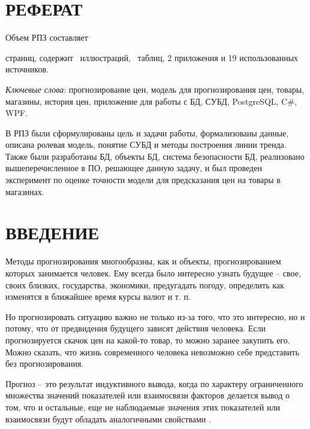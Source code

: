 \documentclass[a4paper]{bmstu}
\begin{document}

\setcounter{page}{3}

\chapter*{РЕФЕРАТ}

Объем РПЗ составляет \begin{NoHyper}\pageref{LastPage}\end{NoHyper} страниц, содержит \totfig~иллюстраций, \tottab~таблиц, 2 приложения и 19 использованных источников.

\textit{Ключевые слова}: прогнозирование цен, модель для прогнозирования цен, товары, магазины, история цен, приложение для работы с БД, СУБД, PostgreSQL, C\#, WPF.

В РПЗ были сформулированы цель и задачи работы, формализованы данные, описана ролевая модель, понятие СУБД и методы построения линии тренда. Также были разработаны БД, объекты БД, система безопасности БД, реализовано вышеперечисленное в ПО, решающее данную задачу, и был проведен эксперимент по оценке точности модели для предсказания цен на товары в магазинах.

\maketableofcontents

\chapter*{ВВЕДЕНИЕ}

Методы прогнозирования многообразны, как и объекты, прогнозированием которых занимается человек. Ему всегда было интересно узнать будущее -- свое, своих близких, государства, экономики, предугадать погоду, определить как изменятся в ближайшее время курсы валют и т. п.

Но прогнозировать ситуацию важно не только из-за того, что это интересно, но и потому, что от предвидения будущего зависят действия человека. Если прогнозируется скачок цен на какой-то товар, то можно заранее закупить его. Можно сказать, что жизнь современного человека невозможно себе представить без прогнозирования.

Прогноз -- это результат индуктивного вывода, когда по характеру ограниченного множества значений показателей или взаимосвязи факторов делается вывод о том, что и остальные, еще не наблюдаемые значения этих показателей или взаимосвязи будут обладать аналогичными свойствами \cite{hse-pred}.
\end{document}
